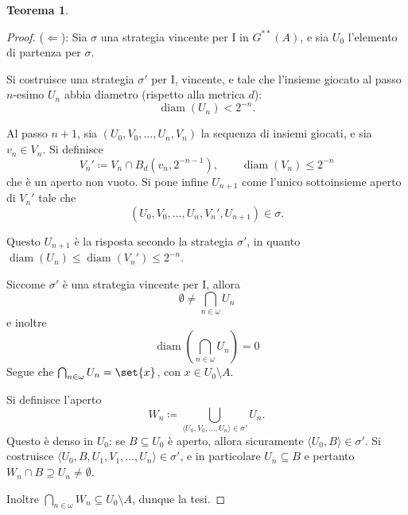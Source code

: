 \documentclass[titlepage]{article}
\newcommand{\1}{\mathds{1}}
\theoremstyle{definition}%
\newtheorem{thm}{Teorema}[section]
\theoremstyle{plain}
\theoremstyle{remark}
\begin{document}
\begin{thm}
\begin{proof}
(\(\Leftarrow\)): Sia \(\sigma\) una strategia vincente per I in \(G^{**}(A)\), e sia \(U_{0}\) l'elemento di partenza per \(\sigma\).

Si costruisce una strategia \(\sigma'\) per I, vincente, e tale che l'insieme giocato al passo \(n\)-esimo \(U_{n}\) abbia diametro (rispetto alla metrica \(d\)):
\begin{equation*}
\operatorname{diam}(U_{n})<2^{-n}.
\end{equation*}

Al passo \(n+1\), sia \((U_{0},V_{0},\dots,U_{n}, V_{n})\) la sequenza di insiemi giocati, e sia \(v_{n} \in V_{n}\). Si definisce
\begin{equation*}
V_{n}'\coloneqq V_{n}\cap B_{d}(v_{n}, 2^{-n-1}), \qquad \operatorname{diam}(V_{n}) \le 2^{-n}
\end{equation*}
che è un aperto non vuoto. Si pone infine \(U_{n+1}\) come l'unico sottoinsieme aperto di \(V_{n}'\) tale che
\begin{equation*}
(U_{0},V_{0},\dots,U_{n}, V_{n}', U_{n+1}) \in \sigma.
\end{equation*}

Questo \(U_{n+1}\) è la risposta secondo la strategia \(\sigma'\), in quanto \(\operatorname{diam}(U_{n})\le \operatorname{diam}(V_{n}')\le 2^{-n}\).

Siccome \(\sigma'\) è una strategia vincente per I, allora
\begin{equation*}
\emptyset\neq\bigcap_{n \in \omega} U_{n}
\end{equation*}
e inoltre
\begin{equation*}
\operatorname{diam}\left(\bigcap_{n \in \omega} U_{n}\right) = 0
\end{equation*}
Segue che \(\bigcap_{n \in \omega} U_{n} = \set{x}\), con \(x \in U_{0}\setminus A\).

Si definisce l'aperto
\begin{equation*}
W_{n} \coloneqq \bigcup_{\langle U_{0},V_{0},\dots,U_{n}\rangle \in \sigma'} U_{n}.
\end{equation*}
Questo è denso in \(U_{0}\): se \(B \subseteq U_{0}\) è aperto, allora sicuramente \(\langle U_{0},B\rangle \in \sigma'\). Si costruisce \(\langle U_{0},B,U_{1},V_{1},\dots,U_{n}\rangle \in \sigma'\), e in particolare \(U_{n} \subseteq B\) e pertanto \(W_{n}\cap B\supseteq U_{n}\neq\emptyset\).

Inoltre \(\bigcap_{n \in \omega} W_{n} \subseteq U_{0}\setminus A\), dunque la tesi.
\end{proof}


\end{thm}
\end{document}
